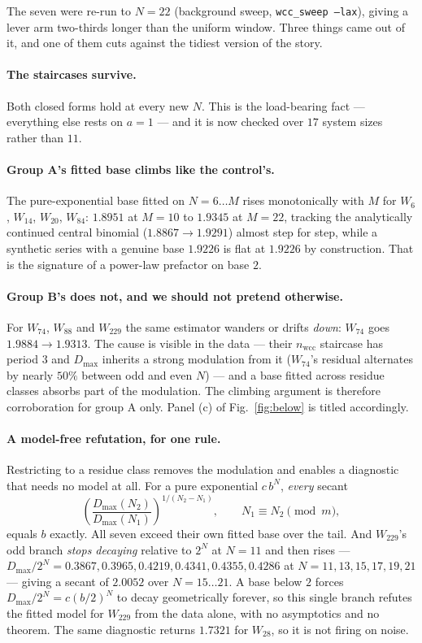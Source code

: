 \documentclass[11pt]{article}
\newcommand{\fn}[1]{\texttt{#1}}
\newcommand{\wcc}{\mathrm{wcc}}
\theoremstyle{plain}
\begin{document}
The seven were re-run to $N=22$ (background sweep, \fn{wcc\_sweep --lax}), giving
a lever arm two-thirds longer than the uniform window. Three things came out of
it, and one of them cuts against the tidiest version of the story.

\paragraph{The staircases survive.} Both closed forms hold at every new $N$. This
is the load-bearing fact --- everything else rests on $a=1$ --- and it is now
checked over $17$ system sizes rather than $11$.

\paragraph{Group A's fitted base climbs like the control's.} The pure-exponential
base fitted on $N=6\ldots M$ rises monotonically with $M$ for $W_6$, $W_{14}$,
$W_{20}$, $W_{84}$: $1.8951$ at $M=10$ to $1.9345$ at $M=22$, tracking the
analytically continued central binomial ($1.8867\to1.9291$) almost step for step,
while a synthetic series with a genuine base $1.9226$ is flat at $1.9226$ by
construction. That is the signature of a power-law prefactor on base $2$.

\paragraph{Group B's does not, and we should not pretend otherwise.} For
$W_{74}$, $W_{88}$ and $W_{229}$ the same estimator wanders or drifts
\emph{down}: $W_{74}$ goes $1.9884\to1.9313$. The cause is visible in the data
--- their $n_\wcc$ staircase has period $3$ and $D_{\max}$ inherits a strong
modulation from it ($W_{74}$'s residual alternates by nearly $50\%$ between odd
and even $N$) --- and a base fitted across residue classes absorbs part of the
modulation. The climbing argument is therefore corroboration for group A only.
Panel (c) of Fig.~\ref{fig:below} is titled accordingly.

\paragraph{A model-free refutation, for one rule.} Restricting to a residue class
removes the modulation and enables a diagnostic that needs no model at all. For a
pure exponential $c\,b^N$, \emph{every} secant
\[
\left(\frac{D_{\max}(N_2)}{D_{\max}(N_1)}\right)^{1/(N_2-N_1)},
\qquad N_1\equiv N_2 \pmod m ,
\]
equals $b$ exactly. All seven exceed their own fitted base over the tail. And
$W_{229}$'s odd branch \emph{stops decaying} relative to $2^N$ at $N=11$ and then
rises --- $D_{\max}/2^N = 0.3867, 0.3965, 0.4219, 0.4341, 0.4355, 0.4286$ at
$N=11,13,15,17,19,21$ --- giving a secant of $\mathbf{2.0052}$ over
$N=15\ldots21$. A base below $2$ forces $D_{\max}/2^N=c(b/2)^N$ to decay
geometrically forever, so this single branch refutes the fitted model for
$W_{229}$ from the data alone, with no asymptotics and no theorem. The same
diagnostic returns $1.7321$ for $W_{28}$, so it is not firing on noise.
\end{document}
